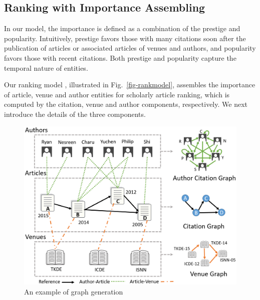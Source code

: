 \subsection{Ranking with Importance Assembling}
\label{subsec-ensemble}

In our model, the importance is defined as a combination of the prestige and popularity. Intuitively, prestige favors those with many citations soon after the publication of articles or associated articles of venues and authors, and popularity favors those with recent citations. Both prestige and popularity capture the temporal nature of entities. %

Our ranking model \ensemblerank,  illustrated in Fig.~\ref{fig-rankmodel}, assembles the importance of article, venue and author entities for scholarly article ranking, which is computed by the citation, venue and author components, respectively.
%
We next introduce the details of the three components.
\begin{figure}[tb!]
\centering
\includegraphics[scale=0.35]{fig/example-graph.eps}
\vspace{-1ex}
\caption{\small An example of graph generation} \label{fig-example-graph}
\vspace{-3ex}
\end{figure}

